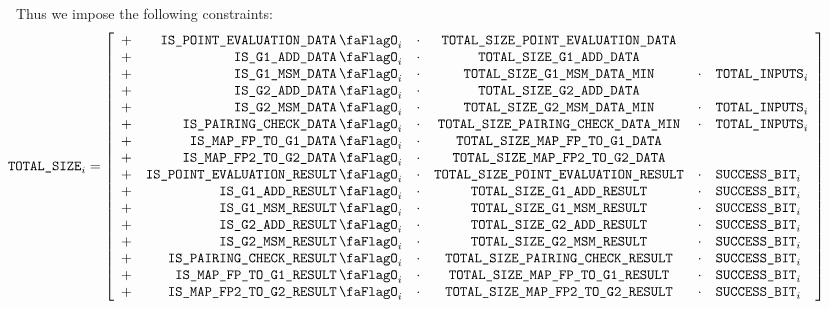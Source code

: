 Thus we impose the following constraints:
\[
    \hspace*{-1.5cm}
    \blsTotalSize _{i}
    =
    \left[ \begin{array}{crcccl}
        + & \isPointEvaluationData     _{i} & \cdot & \totalSizePointEvaluationData     \\
        + & \isBlsGOneAddData          _{i} & \cdot & \totalSizeBlsGOneAddData          \\
        + & \isBlsGOneMsmData          _{i} & \cdot & \totalSizeBlsGOneMsmDataMin       & \cdot & \totalInputs   _{i} \\
        + & \isBlsGTwoAddData          _{i} & \cdot & \totalSizeBlsGTwoAddData          \\
        + & \isBlsGTwoMsmData          _{i} & \cdot & \totalSizeBlsGTwoMsmDataMin       & \cdot & \totalInputs   _{i} \\
        + & \isBlsPairingCheckData     _{i} & \cdot & \totalSizeBlsPairingCheckDataMin  & \cdot & \totalInputs   _{i} \\
        + & \isBlsMapFpToGOneData      _{i} & \cdot & \totalSizeBlsMapFpToGOneData      \\
        + & \isBlsMapFpTwoToGTwoData   _{i} & \cdot & \totalSizeBlsMapFpTwoToGTwoData   \\
        + & \isPointEvaluationResult   _{i} & \cdot & \totalSizePointEvaluationResult   & \cdot & \blsSuccessBit _{i} \\
        + & \isBlsGOneAddResult        _{i} & \cdot & \totalSizeBlsGOneAddResult        & \cdot & \blsSuccessBit _{i} \\
        + & \isBlsGOneMsmResult        _{i} & \cdot & \totalSizeBlsGOneMsmResult        & \cdot & \blsSuccessBit _{i} \\
        + & \isBlsGTwoAddResult        _{i} & \cdot & \totalSizeBlsGTwoAddResult        & \cdot & \blsSuccessBit _{i} \\
        + & \isBlsGTwoMsmResult        _{i} & \cdot & \totalSizeBlsGTwoMsmResult        & \cdot & \blsSuccessBit _{i} \\
        + & \isBlsPairingCheckResult   _{i} & \cdot & \totalSizeBlsPairingCheckResult   & \cdot & \blsSuccessBit _{i} \\
        + & \isBlsMapFpToGOneResult    _{i} & \cdot & \totalSizeBlsMapFpToGOneResult    & \cdot & \blsSuccessBit _{i} \\
        + & \isBlsMapFpTwoToGTwoResult _{i} & \cdot & \totalSizeBlsMapFpTwoToGTwoResult & \cdot & \blsSuccessBit _{i} \\
    \end{array} \right]
\]
